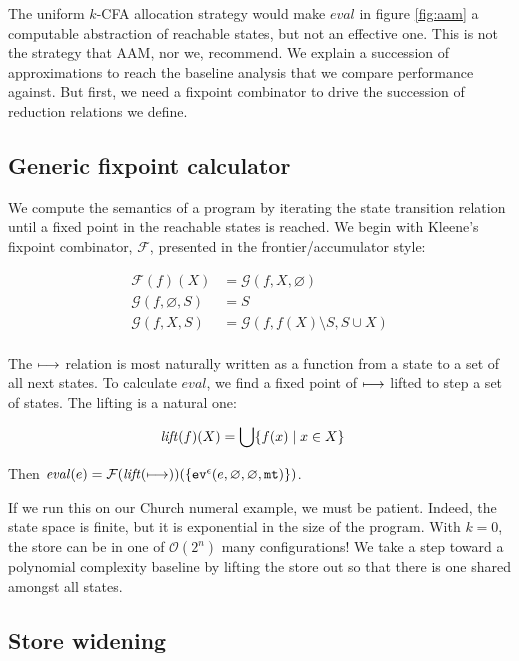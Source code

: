 \documentclass[preprint,onecolumn,9pt]{sigplanconf} %
\begin{document}
The uniform $k$-CFA allocation strategy would make $eval$ in figure
\ref{fig:aam} a computable abstraction of reachable states, but not an
effective one. This is not the strategy that AAM, nor we,
recommend. We explain a succession of approximations to reach the
baseline analysis that we compare performance against. But first, we
need a fixpoint combinator to drive the succession of reduction
relations we define.

\subsection{Generic fixpoint calculator}
\label{sec:fixpoint}

We compute the semantics of a program by iterating the state
transition relation until a fixed point in the reachable states is
reached. We begin with Kleene's fixpoint combinator, ${\mathcal F}$,
presented in the frontier/accumulator style:

\begin{align*}
{\mathcal F}(f)(X) &= {\mathcal G}(f, X, \varnothing) \\
{\mathcal G}(f, \varnothing, S) &= S \\
{\mathcal G}(f, X, S) &= {\mathcal G}(f, f(X) \setminus S, S \cup X) \\
\end{align*}

The $\machstep$ relation is most naturally written as a function from
a state to a set of all next states. To calculate $eval$, we find a fixed point of
$\machstep$ lifted to step a set of states. The lifting is a natural one:

\begin{align*}
\lift(f)(X) &= \bigcup\{f(x) \mid x \in X\}
\end{align*}

Then $\eval(e) = {\mathcal F}(\lift(\machstep))(\{\ev[^\mtcntr]{e, \varnothing, \varnothing, \kmt}\})$.

If we run this on our Church numeral example, we must be
patient. Indeed, the state space is finite, but it is exponential in
the size of the program. With $k = 0$, the store can be in one of ${\mathcal
  O}(2^n)$ many configurations! We take a step toward a polynomial
complexity baseline by lifting the store out so that there is one
shared amongst all states.

\subsection{Store widening}
\label{sec:storewiden}
\end{document}
